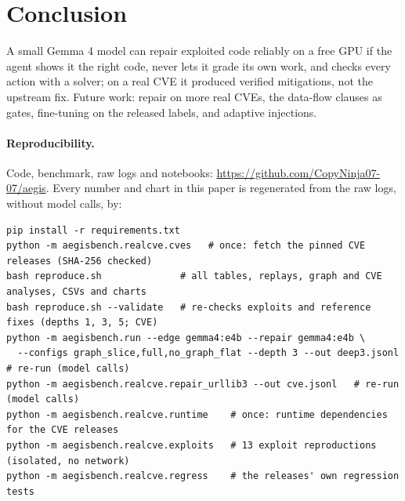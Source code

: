 \documentclass[10pt,a4paper]{article}
\newcommand{\repolink}{\url{https://github.com/CopyNinja07-07/aegis}}
\begin{document}
\section{Conclusion}
A small Gemma 4 model can repair exploited code reliably on a free GPU if the agent shows it the right code, never lets it grade its own work, and checks every action with a solver; on a real CVE it produced verified mitigations, not the upstream fix. Future work: repair on more real CVEs, the data-flow clauses as gates, fine-tuning on the released labels, and adaptive injections.

\paragraph{Reproducibility.} Code, benchmark, raw logs and notebooks: \repolink{}. Every number and chart in this paper is regenerated from the raw logs, without model calls, by:
{\small\begin{verbatim}
pip install -r requirements.txt
python -m aegisbench.realcve.cves   # once: fetch the pinned CVE releases (SHA-256 checked)
bash reproduce.sh              # all tables, replays, graph and CVE analyses, CSVs and charts
bash reproduce.sh --validate   # re-checks exploits and reference fixes (depths 1, 3, 5; CVE)
python -m aegisbench.run --edge gemma4:e4b --repair gemma4:e4b \
  --configs graph_slice,full,no_graph_flat --depth 3 --out deep3.jsonl   # re-run (model calls)
python -m aegisbench.realcve.repair_urllib3 --out cve.jsonl   # re-run (model calls)
python -m aegisbench.realcve.runtime    # once: runtime dependencies for the CVE releases
python -m aegisbench.realcve.exploits   # 13 exploit reproductions (isolated, no network)
python -m aegisbench.realcve.regress    # the releases' own regression tests
\end{verbatim}}
\end{document}
